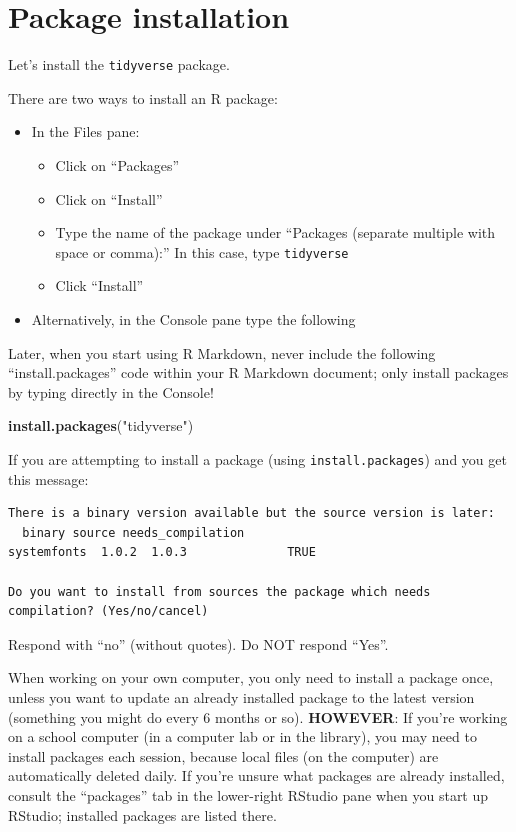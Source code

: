 \documentclass[
]{book}
\newenvironment{Shaded}{\begin{snugshade}}{\end{snugshade}}
\newcommand{\FunctionTok}[1]{\textcolor[rgb]{0.13,0.29,0.53}{\textbf{#1}}}
\newcommand{\NormalTok}[1]{#1}
\newcommand{\StringTok}[1]{\textcolor[rgb]{0.31,0.60,0.02}{#1}}
\providecommand{\tightlist}{%
  \setlength{\itemsep}{0pt}\setlength{\parskip}{0pt}}
\begin{document}
\section{Package installation}\label{package_install}

Let's install the \texttt{tidyverse} package.

There are two ways to install an R package:

\begin{itemize}
\tightlist
\item
  In the Files pane:

  \begin{itemize}
  \tightlist
  \item
    Click on ``Packages''
  \item
    Click on ``Install''
  \item
    Type the name of the package under ``Packages (separate multiple with space or comma):'' In this case, type \texttt{tidyverse}
  \item
    Click ``Install''
  \end{itemize}
\item
  Alternatively, in the Console pane type the following
\end{itemize}

Later, when you start using R Markdown, never include the following ``install.packages'' code within your R Markdown document; only install packages by typing directly in the Console!

\begin{Shaded}
\begin{Highlighting}[]
\FunctionTok{install.packages}\NormalTok{(}\StringTok{"tidyverse"}\NormalTok{)}
\end{Highlighting}
\end{Shaded}

If you are attempting to install a package (using \texttt{install.packages}) and you get this message:

\begin{verbatim}
There is a binary version available but the source version is later:
  binary source needs_compilation
systemfonts  1.0.2  1.0.3              TRUE

Do you want to install from sources the package which needs compilation? (Yes/no/cancel)
\end{verbatim}

Respond with ``no'' (without quotes). Do NOT respond ``Yes''.

When working on your own computer, you only need to install a package once, unless you want to update an already installed package to the latest version (something you might do every 6 months or so). \textbf{HOWEVER}: If you're working on a school computer (in a computer lab or in the library), you may need to install packages each session, because local files (on the computer) are automatically deleted daily. If you're unsure what packages are already installed, consult the ``packages'' tab in the lower-right RStudio pane when you start up RStudio; installed packages are listed there.
\end{document}
